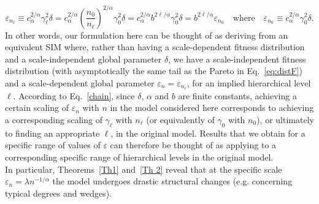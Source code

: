 \documentclass[11pt, reqno]{amsart}
\numberwithin{equation}{section}
\theoremstyle{plain} %
\theoremstyle{definition} %
\newcommand{\eps}{\varepsilon}
\newcommand{\revise}[1]{{\color{black}#1}}
\begin{document}
\begin{equation}
 \eps_{n_\ell} \equiv c_{\alpha}^{2/\alpha} \gamma_{\ell}^{2}\delta   
 = c_{\alpha}^{2/\alpha} \left(\frac{n_0}{n_\ell}\right)^{2/\alpha}
 \gamma_0^2\delta
 = c_{\alpha}^{2/\alpha} b^{2\ell/\alpha}
 \gamma_0^2\delta
=b^{2\ell/\alpha}\eps_{n_0}\quad\text{where}\quad \eps_{n_0} \equiv c_{\alpha}^{2/\alpha} \gamma_{0}^{2}\delta.
\label{chain}
\end{equation}
In other words, our formulation here can be thought of as deriving from an equivalent SIM where, rather than having a scale-dependent fitness distribution and a scale-independent global parameter $\delta$, we have a scale-independent fitness distribution \revise{(with  asymptotically the same tail as the Pareto in Eq.~\eqref{eq:distF})} and a scale-dependent global parameter $\eps_{n}=\eps_{n_\ell}$, for an implied hierarchical level $\ell$.
According to Eq.~\eqref{chain}, since $\delta$, $\alpha$ and $b$ are finite constants, achieving a certain scaling of $\eps_n$ with $n$ in the model considered here corresponds to achieving a corresponding scaling of $\gamma_\ell$ with $n_\ell$ (or equivalently of $\gamma_0$ with $n_0$), or ultimately to finding an appropriate  $\ell$, in the original model. 
Results that we obtain for a specific range of values of $\eps$ can therefore be thought of as applying to a corresponding specific range of hierarchical levels in the original model.\\
In particular, Theorems~\ref{Th1} and~\ref{Th 2} \revise{reveal that at the specific scale $\eps_n = \lambda n^{-1/\alpha}$ the model undergoes drastic structural changes (e.g. concerning typical degrees and wedges).} %
\end{document}
